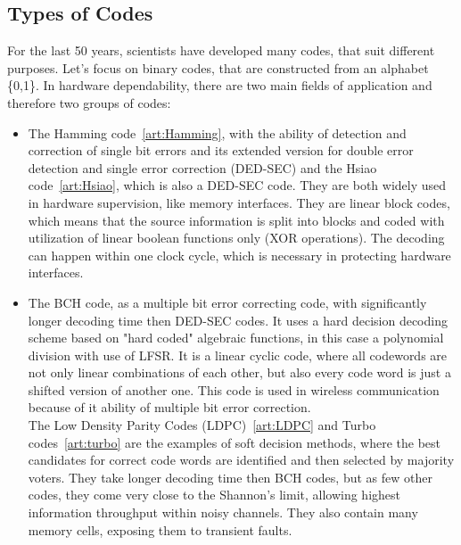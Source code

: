 \subsection{Types of Codes}
For the last 50 years, scientists have developed many codes, that suit different purposes. Let's focus on binary codes, that are constructed from an alphabet \{0,1\}. In hardware dependability, there are two main fields of application and therefore two groups of codes:
\begin{itemize}
\item The Hamming code~\autoref{art:Hamming}, with the ability of detection and correction of single bit errors and its extended version for double error detection and single error correction (DED-SEC) and the Hsiao code~\autoref{art:Hsiao}, which is also a DED-SEC code. They are both widely used in hardware supervision, like memory interfaces. They are linear block codes, which means that the source information is split into blocks and coded with utilization of linear boolean functions only (XOR operations). The decoding can happen within one clock cycle, which is necessary in protecting hardware interfaces.  
\item The BCH code, as a multiple bit error correcting code, with significantly longer decoding time then DED-SEC codes. It uses a hard decision decoding scheme based on "hard coded" algebraic functions, in this case a polynomial division with use of LFSR. It is a linear cyclic code, where all codewords are not only linear combinations of each other, but also every code word is just a shifted version of another one. This code is used in wireless communication because of it ability of multiple bit error correction.\\
The Low Density Parity Codes (LDPC)~\autoref{art:LDPC} and Turbo codes~\autoref{art:turbo} are the examples of soft decision methods, where the best candidates for correct code words are identified and then selected by majority voters. They take longer decoding time then BCH codes, but as few other codes, they come very close to the Shannon's limit, allowing highest information throughput within noisy channels. They also contain many memory cells, exposing them to transient faults.\\
\end{itemize}
